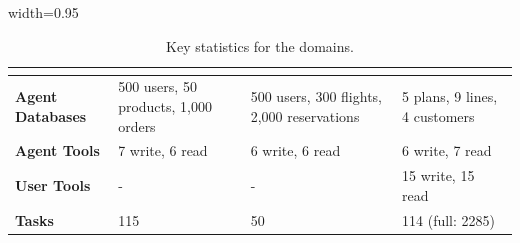 \begin{table}[t]
    \centering
    \caption{Key statistics for the \bench domains.}
    \label{tab:domains}
    \vspace{0.2em}
    \begin{adjustbox}{width=0.95\textwidth}
    \begin{tabular}{llll}
    \toprule
     & \textbf{\retail{}} & \textbf{\airline{}} & \textbf{\telecom{}} \\
    \midrule 
    \textbf{Agent Databases} & 500 users, 50 products, 1,000 orders & 500 users, 300 flights, 2,000 reservations & 5 plans, 9 lines, 4 customers \\
    \textbf{Agent Tools} & 7 write, 6 read & 6 write, 6 read & 6 write, 7 read \\
    \textbf{User Tools} & - & - & 15 write, 15 read \\
    \textbf{Tasks} & 115 & 50 & 114 (full: 2285)\\
    \bottomrule
    \end{tabular}
    \end{adjustbox}
\end{table}
